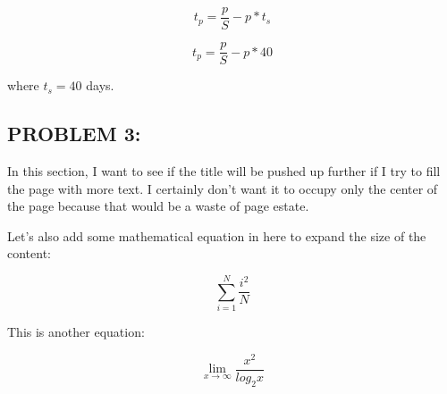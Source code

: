 \documentclass[12pt,letterpaper]{article}
\begin{document}
\[ t_{p} = \frac{p}{S} - p * t_{s} \]

\[ t_{p} = \frac{p}{S} - p * 40 \]

where \(t_{s} = 40\) days.

\pagebreak


\subsection*{PROBLEM 3:}
In this section, I want to see if the title will be pushed up further if I try to fill the page with more
text. I certainly don't want it to occupy only the center of the page because that would be a waste of page
estate.

Let's also add some mathematical equation in here to expand the size of the content:

\[ \sum_{i=1}^{N} \frac {i^2} {N} \]

This is another equation:

\[ \lim_{x \to \infty } \frac{x^2}{log_2 x} \]
\end{document}
